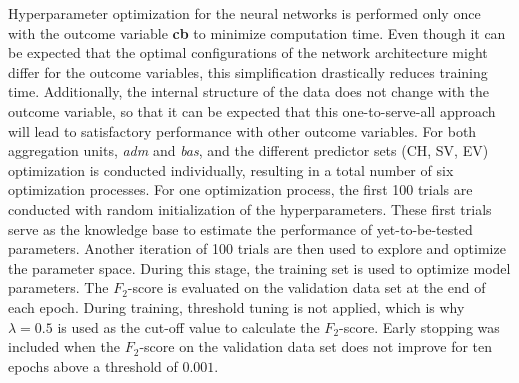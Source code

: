 \documentclass[a4paper,11pt]{article}
\begin{document}
Hyperparameter optimization for the neural networks is performed only once with
the outcome variable \textbf{cb} to minimize computation time. Even though it
can be expected that the optimal configurations of the network architecture might
differ for the outcome variables, this simplification drastically reduces
training time. Additionally, the internal structure of the data does not change
with the outcome variable, so that it can be expected that this one-to-serve-all
approach will lead to satisfactory performance with other outcome variables.
For both aggregation units, \emph{adm} and \emph{bas}, and the different predictor sets
(CH, SV, EV) optimization is conducted individually, resulting in a total number
of six optimization processes. For one optimization process, the first 100 trials are conducted with
random initialization of the hyperparameters. These first trials serve as the
knowledge base to estimate the performance of yet-to-be-tested parameters. Another iteration of
100 trials are then used to explore and optimize the parameter space. During this stage,
the training set is used to optimize model parameters. The \(F_2\)-score is evaluated
on the validation data set at the end of each epoch. During training, threshold
tuning is not applied, which is why \(\lambda = 0.5\) is used as the cut-off value
to calculate the \(F_2\)-score. Early stopping was included when the \(F_2\)-score
on the validation data set does not improve for ten epochs above a threshold of
\(0.001\).
\end{document}
